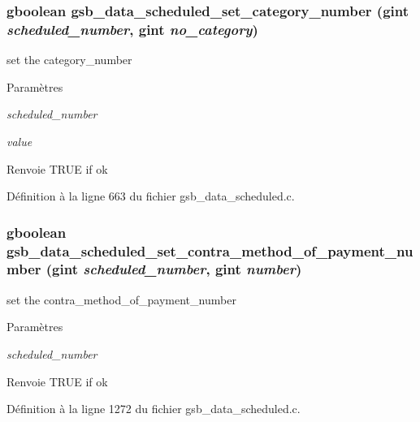 \subsubsection[{gsb\_\-data\_\-scheduled\_\-set\_\-category\_\-number}]{\setlength{\rightskip}{0pt plus 5cm}gboolean gsb\_\-data\_\-scheduled\_\-set\_\-category\_\-number (gint {\em scheduled\_\-number}, \/  gint {\em no\_\-category})}\label{gsb__data__scheduled_8c_ad29b4497cacf9929c087ab5a84bcfc08}
set the category\_\-number


\begin{DoxyParams}{Paramètres}
\item[{\em scheduled\_\-number}]\item[{\em value}]\end{DoxyParams}
\begin{DoxyReturn}{Renvoie}
TRUE if ok 
\end{DoxyReturn}


Définition à la ligne 663 du fichier gsb\_\-data\_\-scheduled.c.

\subsubsection[{gsb\_\-data\_\-scheduled\_\-set\_\-contra\_\-method\_\-of\_\-payment\_\-number}]{\setlength{\rightskip}{0pt plus 5cm}gboolean gsb\_\-data\_\-scheduled\_\-set\_\-contra\_\-method\_\-of\_\-payment\_\-number (gint {\em scheduled\_\-number}, \/  gint {\em number})}\label{gsb__data__scheduled_8c_a8fcb6154f8ab3b51eb2c9aa99b4f4362}
set the contra\_\-method\_\-of\_\-payment\_\-number


\begin{DoxyParams}{Paramètres}
\item[{\em scheduled\_\-number}]\item[{\em }]\end{DoxyParams}
\begin{DoxyReturn}{Renvoie}
TRUE if ok 
\end{DoxyReturn}


Définition à la ligne 1272 du fichier gsb\_\-data\_\-scheduled.c.

